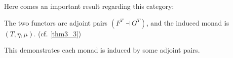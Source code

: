 \documentclass{article}
\begin{document}
Here comes an important result regarding this category:
\begin{thm}
    The two functors are adjoint pairs $(F^T\dashv G^T)$, and the induced monad is $(T,\eta,\mu)$. (cf. \ref{thm3_3})
\end{thm}%


This demonstrates each monad is induced by some adjoint pairs.

\hfil
\end{document}
